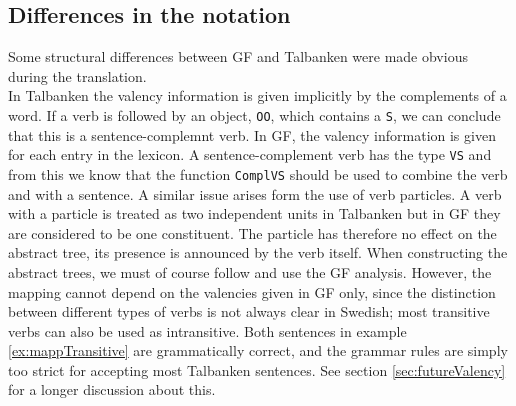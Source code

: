 \documentclass{report}
\begin{document}
\subsection{Differences in the notation}
Some structural differences between GF and Talbanken were made obvious during the
translation. \\
In Talbanken the valency information is given implicitly by the complements
of a word. If a verb is followed by an object, \verb-OO-, which contains a
\verb-S-, we can conclude that this is a sentence-complemnt verb.
In GF, the valency information is given for each entry in the lexicon.
A sentence-complement verb has the type \verb-VS- and from this we know 
that the function \verb-ComplVS- should be used to combine the verb and with a 
sentence.
A similar issue arises form the use of verb particles. A verb with a
particle is treated as two independent units in Talbanken but in GF they are
considered to be one constituent. %
The particle has therefore no effect on the abstract tree, its presence is
announced by the verb itself.
When constructing the abstract trees, we must of course follow and use the
GF analysis. However,
the mapping cannot depend on the valencies given in GF only, 
since the distinction between different types of verbs is not always clear in Swedish;
most transitive verbs can also be used as intransitive. Both sentences in
example \ref{ex:mappTransitive} are grammatically correct, and
the grammar rules are simply too strict for accepting most Talbanken sentences.
\label{ex:mappTransitive}
See section \ref{sec:futureValency} for a longer discussion about this.\\
\end{document}
